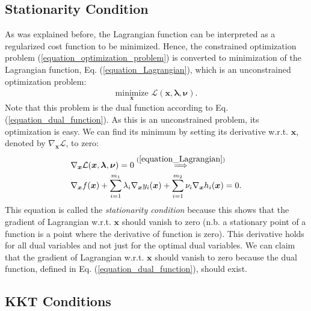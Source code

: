 \documentclass[lang=cn,10pt]{gorgeousnbook}
\numberwithin{equation}{section}%
\numberwithin{figure}{section}%
\begin{document}
\subsection{Stationarity Condition}

As was explained before, the Lagrangian function can be interpreted as a regularized cost function to be minimized. Hence, the constrained optimization problem (\ref{equation_optimization_problem}) is converted to minimization of the Lagrangian function, Eq. (\ref{equation_Lagrangian}), which is an unconstrained optimization problem:
\begin{align}
\underset{\boldsymbol{x}}{\text{minimize}}\,\, \mathcal{L}(\boldsymbol{x},\boldsymbol{\lambda},\boldsymbol{\nu}).
\end{align}
Note that this problem is the dual function according to Eq. (\ref{equation_dual_function}). 
As this is an unconstrained problem, its optimization is easy. We can find its minimum by setting its derivative w.r.t. $\boldsymbol{x}$, denoted by $\nabla_{\boldsymbol{x}} \mathcal{L}$, to zero:
\begin{equation}
\begin{aligned}
&\nabla_{\boldsymbol{x}} \mathcal{L}(\boldsymbol{x},\boldsymbol{\lambda},\boldsymbol{\nu}) = 0 \overset{(\ref{equation_Lagrangian})}{\implies} \\
& \nabla_{\boldsymbol{x}} f(\boldsymbol{x}) + \sum_{i=1}^{m_1} \lambda_i \nabla_{\boldsymbol{x}} y_i(\boldsymbol{x}) + \sum_{i=1}^{m_2} \nu_i \nabla_{\boldsymbol{x}} h_i(\boldsymbol{x}) = 0.
\end{aligned}
\end{equation}
This equation is called the \textit{stationarity condition} because this shows that the gradient of Lagrangian w.r.t. $\boldsymbol{x}$ should vanish to zero (n.b. a stationary point of a function is a point where the derivative of function is zero). This derivative holds for all dual variables and not just for the optimal dual variables. 
We can claim that the gradient of Lagrangian w.r.t. $\boldsymbol{x}$ should vanish to zero because the dual function, defined in Eq. (\ref{equation_dual_function}), should exist.  

\subsection{KKT Conditions}
\end{document}
